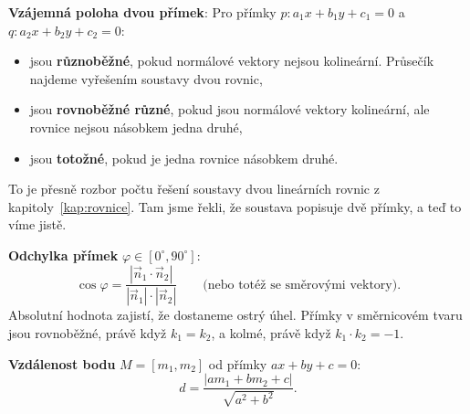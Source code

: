 \begin{center}
\end{center}

\begin{definitionbox}
  \textbf{Vzájemná poloha dvou přímek}: Pro přímky $p: a_1x + b_1y + c_1 = 0$ a $q: a_2x + b_2y + c_2 = 0$:
  \begin{itemize}
    \item jsou \textbf{různoběžné}, pokud normálové vektory nejsou kolineární. Průsečík najdeme vyřešením soustavy dvou rovnic,
    \item jsou \textbf{rovnoběžné různé}, pokud jsou normálové vektory kolineární, ale rovnice nejsou násobkem jedna druhé,
    \item jsou \textbf{totožné}, pokud je jedna rovnice násobkem druhé.
  \end{itemize}
  To je přesně rozbor počtu řešení soustavy dvou lineárních rovnic z kapitoly~\ref{kap:rovnice}. Tam jsme řekli, že soustava popisuje dvě přímky, a teď to víme jistě.

  \vspace{0.2cm}

  \textbf{Odchylka přímek} $\varphi\in[0^\circ, 90^\circ]$:
  \begin{equation*}
    \cos\varphi = \frac{|\vec{n}_1\cdot\vec{n}_2|}{|\vec{n}_1|\cdot|\vec{n}_2|}\qquad\text{(nebo totéž se směrovými vektory)}.
  \end{equation*}
  Absolutní hodnota zajistí, že dostaneme ostrý úhel. Přímky v směrnicovém tvaru jsou rovnoběžné, právě když $k_1 = k_2$, a kolmé, právě když $k_1\cdot k_2 = -1$.

  \vspace{0.2cm}

  \textbf{Vzdálenost bodu} $M = [m_1, m_2]$ od přímky $ax + by + c = 0$:
  \begin{equation*}
    d = \frac{|am_1 + bm_2 + c|}{\sqrt{a^2 + b^2}}.
  \end{equation*}
\end{definitionbox}

